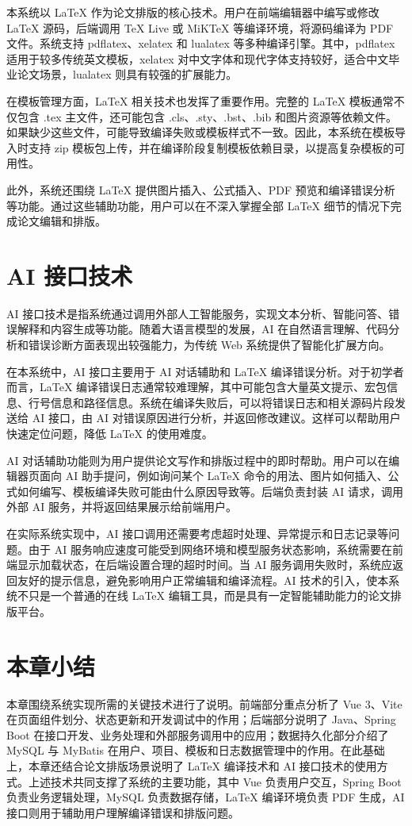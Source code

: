 \documentclass{xduugthesis}
\begin{document}
本系统以 LaTeX 作为论文排版的核心技术。用户在前端编辑器中编写或修改 LaTeX 源码，后端调用 TeX Live 或 MiKTeX 等编译环境，将源码编译为 PDF 文件。系统支持 pdflatex、xelatex 和 lualatex 等多种编译引擎。其中，pdflatex 适用于较多传统英文模板，xelatex 对中文字体和现代字体支持较好，适合中文毕业论文场景，lualatex 则具有较强的扩展能力。

在模板管理方面，LaTeX 相关技术也发挥了重要作用。完整的 LaTeX 模板通常不仅包含 .tex 主文件，还可能包含 .cls、.sty、.bst、.bib 和图片资源等依赖文件。如果缺少这些文件，可能导致编译失败或模板样式不一致。因此，本系统在模板导入时支持 zip 模板包上传，并在编译阶段复制模板依赖目录，以提高复杂模板的可用性。

此外，系统还围绕 LaTeX 提供图片插入、公式插入、PDF 预览和编译错误分析等功能。通过这些辅助功能，用户可以在不深入掌握全部 LaTeX 细节的情况下完成论文编辑和排版。

\section{AI 接口技术}
AI 接口技术是指系统通过调用外部人工智能服务，实现文本分析、智能问答、错误解释和内容生成等功能。随着大语言模型的发展，AI 在自然语言理解、代码分析和错误诊断方面表现出较强能力，为传统 Web 系统提供了智能化扩展方向\cite{vaswani2017attention}。

在本系统中，AI 接口主要用于 AI 对话辅助和 LaTeX 编译错误分析。对于初学者而言，LaTeX 编译错误日志通常较难理解，其中可能包含大量英文提示、宏包信息、行号信息和路径信息。系统在编译失败后，可以将错误日志和相关源码片段发送给 AI 接口，由 AI 对错误原因进行分析，并返回修改建议。这样可以帮助用户快速定位问题，降低 LaTeX 的使用难度。

AI 对话辅助功能则为用户提供论文写作和排版过程中的即时帮助。用户可以在编辑器页面向 AI 助手提问，例如询问某个 LaTeX 命令的用法、图片如何插入、公式如何编写、模板编译失败可能由什么原因导致等。后端负责封装 AI 请求，调用外部 AI 服务，并将返回结果展示给前端用户。

在实际系统实现中，AI 接口调用还需要考虑超时处理、异常提示和日志记录等问题。由于 AI 服务响应速度可能受到网络环境和模型服务状态影响，系统需要在前端显示加载状态，在后端设置合理的超时时间。当 AI 服务调用失败时，系统应返回友好的提示信息，避免影响用户正常编辑和编译流程。AI 技术的引入，使本系统不只是一个普通的在线 LaTeX 编辑工具，而是具有一定智能辅助能力的论文排版平台。

\section{本章小结}
本章围绕系统实现所需的关键技术进行了说明。前端部分重点分析了 Vue 3、Vite 在页面组件划分、状态更新和开发调试中的作用；后端部分说明了 Java、Spring Boot 在接口开发、业务处理和外部服务调用中的应用；数据持久化部分介绍了 MySQL 与 MyBatis 在用户、项目、模板和日志数据管理中的作用。在此基础上，本章还结合论文排版场景说明了 LaTeX 编译技术和 AI 接口技术的使用方式。上述技术共同支撑了系统的主要功能，其中 Vue 负责用户交互，Spring Boot 负责业务逻辑处理，MySQL 负责数据存储，LaTeX 编译环境负责 PDF 生成，AI 接口则用于辅助用户理解编译错误和排版问题。
\end{document}
